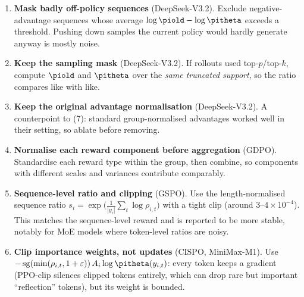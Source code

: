 \begin{enumerate}
\item \textbf{Mask badly off-policy sequences} (DeepSeek-V3.2). Exclude negative-advantage
sequences whose average $\log\piold-\log\pitheta$ exceeds a threshold. Pushing down
samples the current policy would hardly generate anyway is mostly noise.
\item \textbf{Keep the sampling mask} (DeepSeek-V3.2). If rollouts used top-$p$/top-$k$,
compute $\piold$ and $\pitheta$ over the \emph{same truncated support}, so the ratio compares
like with like.
\item \textbf{Keep the original advantage normalisation} (DeepSeek-V3.2). A counterpoint to
(7): standard group-normalised advantages worked well in their setting, so ablate before
removing.
\item \textbf{Normalise each reward component before aggregation} (GDPO). Standardise each
reward type within the group, then combine, so components with different scales and variances
contribute comparably.
\item \textbf{Sequence-level ratio and clipping} (GSPO). Use the length-normalised sequence
ratio $s_i=\exp\big(\frac1{|y_i|}\sum_t\log\rho_{i,t}\big)$ with a tight clip (around
$3$--$4\times10^{-4}$). This matches the sequence-level reward and is reported to be more
stable, notably for MoE models where token-level ratios are noisy.
\item \textbf{Clip importance weights, not updates} (CISPO, MiniMax-M1). Use
$-\operatorname{sg}(\min(\rho_{i,t},1+\varepsilon))\,A_i\log\pitheta(y_{i,t})$: every token
keeps a gradient (PPO-clip silences clipped tokens entirely, which can drop rare but
important ``reflection'' tokens), but its weight is bounded.
\end{enumerate}

